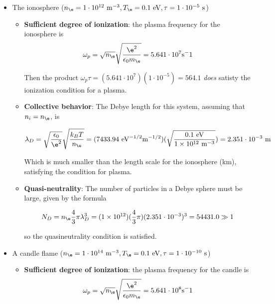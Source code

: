 \documentclass{template}
\begin{document}
\begin{itemize}
    \item The ionosphere ($n_\e = 1\cdot 10^{12}\text{ m}^{-3}, T_\e = 0.1\text{ eV}, \tau = 1\cdot 10^{-5}\text{ s}$)
    
    \begin{itemize}
        \item \textbf{Sufficient degree of ionization}: the plasma frequency for the ionosphere is
        \begin{equation}
            \omega_p = \sqrt{n_\e}\sqrt{\frac{\e^2}{\epsilon_0 m_\e}} = 5.641\cdot 10^7 \text{s}^-1
        \end{equation}

        Then the product $\omega_p \tau = (5.641\cdot 10^7)(1\cdot 10^{-5}) = 564.1$ \textit{does} satisty the ionization condition for a plasma.
        \item \textbf{Collective behavior}: The Debye length for this system, assuming that $n_i = n_\e$, is

        \begin{equation}
            \lambda_D = \sqrt{\frac{\epsilon_0}{\e^2}}\sqrt{\frac{k_B T}{n_\e}} = ( 7433.94\text{ eV}^{-1/2}\text{m}^{-1/2})(\sqrt{\frac{0.1\text{ eV}}{1\times10^{12}\text{ m}^{-3}}}) = 2.351 \cdot 10^{-3}\text{ m}
        \end{equation}

        Which is much smaller than the length scale for the ionosphere (km), satisfying the condition for plasma.

        \item \textbf{Quasi-neutrality}: The number of particles in a Debye sphere must be large, given by the formula
        
        \begin{equation}
            N_D = n_\e \frac{4}{3}\pi \lambda_D^3 = (1\times 10^{12})(\frac{4}{3}\pi)(2.351 \cdot 10^{-3})^3 = 54431.0 \gg 1
        \end{equation}

        so the quasineutrality condition is satisfied.
    \end{itemize}
    




    \item A candle flame ($n_\e = 1\cdot 10^{14}\text{ m}^{-3}, T_\e = 0.1\text{ eV}, \tau = 1\cdot 10^{-10}\text{ s}$)
    
    \begin{itemize}
        \item \textbf{Sufficient degree of ionization}: the plasma frequency for the candle is
        \begin{equation}
            \omega_p = \sqrt{n_\e}\sqrt{\frac{\e^2}{\epsilon_0 m_\e}} = 5.641\cdot 10^8 \text{s}^-1
        \end{equation}


\end{itemize}
\end{itemize}
\end{document}
